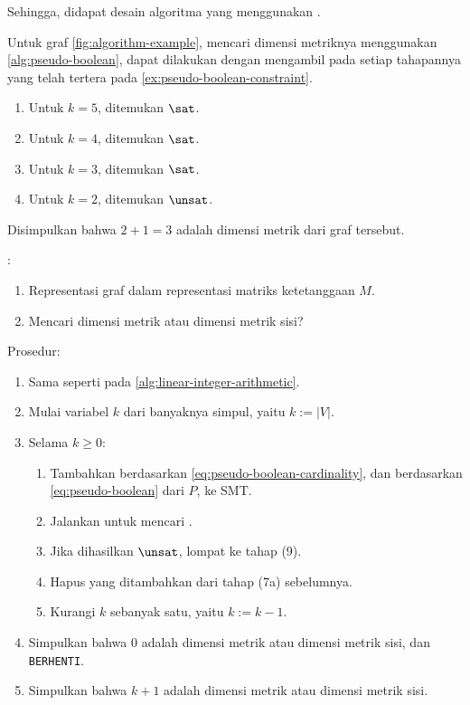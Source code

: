 Sehingga, didapat desain algoritma yang menggunakan .

\begin{example}
	Untuk graf \autoref{fig:algorithm-example}, mencari dimensi metriknya menggunakan \autoref{alg:pseudo-boolean}, dapat dilakukan dengan mengambil pada setiap tahapannya  yang telah tertera pada \autoref{ex:pseudo-boolean-constraint}.
	\begin{enumerate}
		\item Untuk \(k = 5\), ditemukan \(\sat\).
		\item Untuk \(k = 4\), ditemukan \(\sat\).
		\item Untuk \(k = 3\), ditemukan \(\sat\).
		\item Untuk \(k = 2\), ditemukan \(\unsat\).
	\end{enumerate}
	Disimpulkan bahwa \(2 + 1 = 3\) adalah dimensi metrik dari graf tersebut.
\end{example}

\begin{algorithm}
	:
	\begin{enumerate}
		\item Representasi graf dalam representasi matriks ketetanggaan \(M\).
		\item Mencari dimensi metrik atau dimensi metrik sisi?
	\end{enumerate}
	Prosedur:
	\begin{enumerate}
		\item[1--5.] Sama seperti pada \autoref{alg:linear-integer-arithmetic}.
		\setcounter{enumi}{5}
		\item Mulai variabel \(k\) dari banyaknya simpul, yaitu \(k := |V|\).
		\item Selama \(k \geq 0\):
			\begin{enumerate}
					\item Tambahkan  berdasarkan \autoref{eq:pseudo-boolean-cardinality}, dan berdasarkan \autoref{eq:pseudo-boolean} dari \(P\), ke  SMT.
					\item Jalankan  untuk mencari .
					\item Jika dihasilkan \(\unsat\), lompat ke tahap (9).
					\item Hapus  yang ditambahkan dari tahap (7a) sebelumnya.
					\item Kurangi \(k\) sebanyak satu, yaitu \(k := k - 1\).
			\end{enumerate}
		\item Simpulkan bahwa 0 adalah dimensi metrik atau dimensi metrik sisi, dan \texttt{BERHENTI}.
		\item Simpulkan bahwa \(k + 1\) adalah dimensi metrik atau dimensi metrik sisi.
	\end{enumerate}
	\caption{}
	\label{alg:pseudo-boolean}
\end{algorithm}

